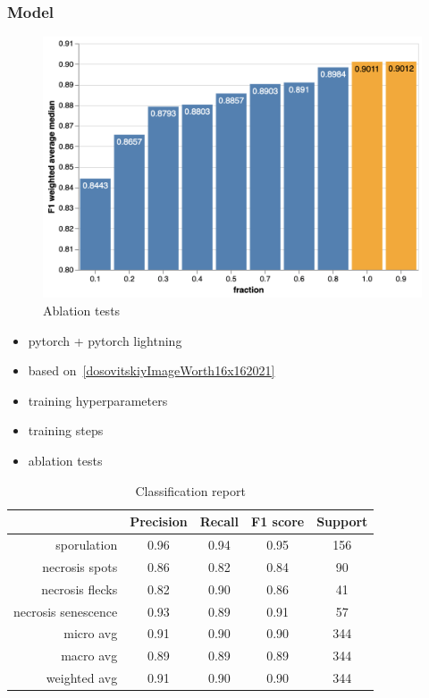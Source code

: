 \documentclass[english]{article}
\begin{document}
\subsubsection{Model}

\begin{figure}[H]
	\centering
	\includegraphics[width=0.8\linewidth]{2023_cdt_data_frac_evolution.png}
	\caption*{Ablation tests}\label{fig:ablationtests}
\end{figure}

\begin{itemize}
    \item pytorch + pytorch lightning
    \item based on~\ref{dosovitskiyImageWorth16x162021}
    \item training hyperparameters
    \item training steps
    \item ablation tests
\end{itemize}

\begin{table}[H]
	\begin{minipage}{0.4\linewidth}
		\centering
		\caption{Classification report}\label{tab:imprpatches4phenotypes}
		\begin{tabular}{rcccc}
			\toprule
			{}                  & Precision & Recall & F1 score & Support \\
			\midrule
			sporulation         & 0.96      & 0.94   & 0.95     & 156     \\
			necrosis spots       & 0.86      & 0.82   & 0.84     & 90      \\
			necrosis flecks     & 0.82      & 0.90   & 0.86     & 41      \\
			necrosis senescence & 0.93      & 0.89   & 0.91     & 57      \\
			micro avg           & 0.91      & 0.90   & 0.90     & 344     \\
			macro avg           & 0.89      & 0.89   & 0.89     & 344     \\
			weighted avg        & 0.91      & 0.90   & 0.90     & 344     \\
			\bottomrule
		\end{tabular}
	\end{minipage}
\end{table}
\end{document}
